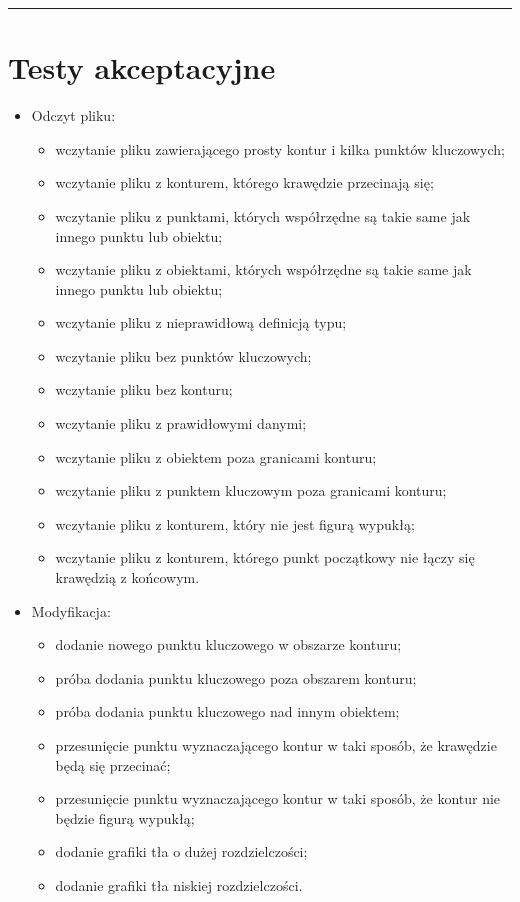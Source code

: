 \documentclass[a4paper,11pt]{article}
\newcommand{\linia}{\rule{\linewidth}{0.4mm}}
\begin{document}
\noindent\linia
\section{Testy akceptacyjne}
\begin{itemize}
\item Odczyt pliku:
\begin{itemize}
\item wczytanie pliku zawierającego prosty kontur i kilka punktów kluczowych;
\item wczytanie pliku z konturem, którego krawędzie przecinają się;
\item wczytanie pliku z punktami, których współrzędne są takie same jak innego punktu lub obiektu;
\item wczytanie pliku z obiektami, których współrzędne są takie same jak innego punktu lub obiektu;
\item wczytanie pliku z nieprawidłową definicją typu;
\item wczytanie pliku bez punktów kluczowych;
\item wczytanie pliku bez konturu;
\item wczytanie pliku z prawidłowymi danymi;
\item wczytanie pliku z obiektem poza granicami konturu;
\item wczytanie pliku z punktem kluczowym poza granicami konturu;
\item wczytanie pliku z konturem, który nie jest figurą wypukłą;
\item wczytanie pliku z konturem, którego punkt początkowy nie łączy się krawędzią z końcowym.
\end{itemize}
\item Modyfikacja:
\begin{itemize}
\item dodanie nowego punktu kluczowego w obszarze konturu;
\item próba dodania punktu kluczowego poza obszarem konturu;
\item próba dodania punktu kluczowego nad innym obiektem;
\item przesunięcie punktu wyznaczającego kontur w taki sposób, że krawędzie będą się przecinać;
\item przesunięcie punktu wyznaczającego kontur w taki sposób, że kontur nie będzie figurą wypukłą;
\item dodanie grafiki tła o dużej rozdzielczości;
\item dodanie grafiki tła niskiej rozdzielczości.
\end{itemize}

\end{itemize}
\end{document}
